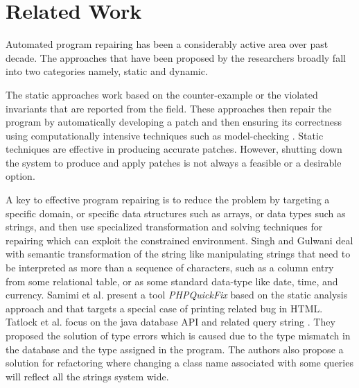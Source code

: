 \section{Related Work}
\label{sec:relatedWork}

Automated program repairing has been a considerably active
area over past decade. The approaches that have been proposed by the researchers
broadly fall into two categories namely, static and dynamic.

The static approaches work based on the counter-example or the violated
invariants that are reported from the field. These approaches then repair the
program by automatically developing a patch and then ensuring its correctness
using computationally intensive techniques such as model-checking
\cite{biere2014, wei-issta-2010}. Static techniques are effective in producing accurate patches. However, shutting
down the system to produce and apply patches is not always a feasible or
a desirable option.

A key to effective program repairing is to reduce the problem by 
targeting a specific domain, or specific data structures such as arrays, or data types such as strings, and then use
specialized transformation and solving techniques for repairing which can exploit the constrained environment. 
Singh and Gulwani \cite{Singh:2012} deal with semantic transformation of the string
like manipulating strings that need to be interpreted as more than a sequence of
characters, such as a column entry from some relational table, or as some
standard data-type like date, time, and currency. Samimi et al. \cite{SamirniSAMTH12}
 present a tool \textit{PHPQuickFix} based on the static analysis approach and that
targets a special case of printing related bug in HTML.
Tatlock et al. focus on the java database API and related query string \cite{Tatlock:2008}. They
proposed the solution of type errors which is caused due to the type mismatch in
the database and the type assigned in the program. The authors also propose a
solution for refactoring where changing a class name associated with some
queries will reflect all the strings system wide.

